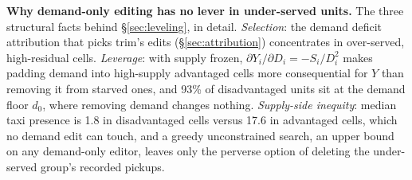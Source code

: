 \textbf{Why demand-only editing has no lever in under-served units.} The three
structural facts behind \S\ref{sec:leveling}, in detail. \emph{Selection}: the
demand deficit attribution that picks trim's edits (\S\ref{sec:attribution})
concentrates in over-served, high-residual cells. \emph{Leverage}: with supply frozen,
$\partial Y_i / \partial D_i = -S_i / D_i^{2}$ makes padding demand into
high-supply advantaged cells more consequential for $Y$ than removing it from starved
ones, and 93\% of disadvantaged units sit at the demand floor $d_0$, where
removing demand changes nothing. \emph{Supply-side inequity}: median taxi
presence is 1.8 in disadvantaged cells versus 17.6 in advantaged cells, which
no demand edit can touch, and a greedy unconstrained search, an upper bound on
any demand-only editor, leaves only the perverse option of deleting the
under-served group's recorded pickups.

